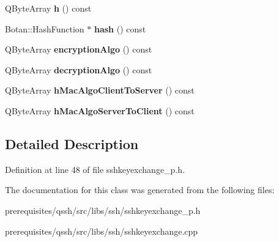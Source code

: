 \begin{DoxyCompactItemize}
Q\+Byte\+Array {\bfseries h} () const
\item 
\mbox{\label{class_q_ssh_1_1_internal_1_1_ssh_key_exchange_adc204675e68da1be7c27f6e19668c480}} 
Botan\+::\+Hash\+Function $\ast$ {\bfseries hash} () const
\item 
\mbox{\label{class_q_ssh_1_1_internal_1_1_ssh_key_exchange_aca3eab14c976b7b136ac80c8575dc7e5}} 
Q\+Byte\+Array {\bfseries encryption\+Algo} () const
\item 
\mbox{\label{class_q_ssh_1_1_internal_1_1_ssh_key_exchange_ad2089c0eb2efa176bf7185dd9a7c9feb}} 
Q\+Byte\+Array {\bfseries decryption\+Algo} () const
\item 
\mbox{\label{class_q_ssh_1_1_internal_1_1_ssh_key_exchange_a65938f28dc6d5d0937c3d37935c6fbf1}} 
Q\+Byte\+Array {\bfseries h\+Mac\+Algo\+Client\+To\+Server} () const
\item 
\mbox{\label{class_q_ssh_1_1_internal_1_1_ssh_key_exchange_af99966bb7c0b8fb698a19fc41c1203c8}} 
Q\+Byte\+Array {\bfseries h\+Mac\+Algo\+Server\+To\+Client} () const
\end{DoxyCompactItemize}


\subsection{Detailed Description}


Definition at line 48 of file sshkeyexchange\+\_\+p.\+h.



The documentation for this class was generated from the following files\+:\begin{DoxyCompactItemize}
\item 
prerequisites/qssh/src/libs/ssh/sshkeyexchange\+\_\+p.\+h\item 
prerequisites/qssh/src/libs/ssh/sshkeyexchange.\+cpp\end{DoxyCompactItemize}
